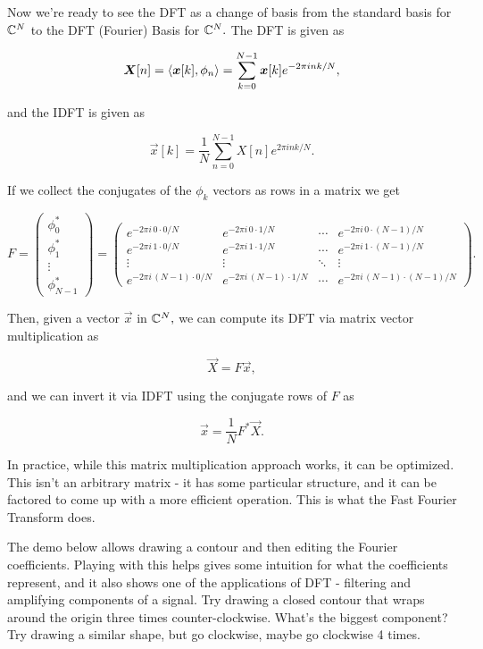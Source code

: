 \documentclass{article}
\begin{document}
Now we're ready to see the DFT as a change of basis from the standard basis for $\mathbb{C}^N$ to the DFT (Fourier) Basis for $\mathbb{C}^N.$ The DFT is given as

\[ \boldsymbol{X}[n] = \left\langle \boldsymbol{x}[k], \phi_n \right\rangle = \sum_{k=0}^{N-1} \boldsymbol{x}[k] e^{-2 \pi i n k / N}, \]

and the IDFT is given as

\[ \vec{x}[k] = \frac{1}{N} \sum_{n=0}^{N-1} X[n] e^{2 \pi i n k / N}. \]

If we collect the conjugates of the $\phi_k$ vectors as rows in a matrix we get

\[ F =
\begin{pmatrix}
\phi_0^{*} \\
\phi_1^{*} \\
\vdots \\
\phi_{N-1}^{*}
\end{pmatrix}
= \begin{pmatrix}
e^{-2\pi i\,0\cdot 0/N} & e^{-2\pi i\,0\cdot 1/N} & \cdots & e^{-2\pi i\,0\cdot (N-1)/N} \\
e^{-2\pi i\,1\cdot 0/N} & e^{-2\pi i\,1\cdot 1/N} & \cdots & e^{-2\pi i\,1\cdot (N-1)/N} \\
\vdots & \vdots & \ddots & \vdots \\
e^{-2\pi i\,(N-1)\cdot 0/N} & e^{-2\pi i\,(N-1)\cdot 1/N} & \cdots & e^{-2\pi i\,(N-1)\cdot (N-1)/N}
\end{pmatrix}. \]

Then, given a vector $\vec{x}$ in $\mathbb{C}^N,$ we can compute its DFT via matrix vector multiplication as

\[ \vec{X} = F \vec{x}, \]

and we can invert it via IDFT using the conjugate rows of $F$ as

\[ \vec{x} = \frac{1}{N} F^{*} \vec{X}. \]

\begin{note}
In practice, while this matrix multiplication approach works, it can be optimized. This isn't an arbitrary matrix - it has some particular structure, and it can be factored to come up with a more efficient operation. This is what the Fast Fourier Transform does.
\end{note}

The demo below allows drawing a contour and then editing the Fourier coefficients. Playing with this helps gives some intuition for what the coefficients represent, and it also shows one of the applications of DFT - filtering and amplifying components of a signal. Try drawing a closed contour that wraps around the origin three times counter-clockwise. What's the biggest component? Try drawing a similar shape, but go clockwise, maybe go clockwise 4 times.

\end{document}
